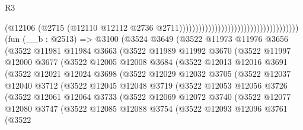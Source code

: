 \begin{lexlean}{R3}
\begin{coremodule}
                                                                        (@12106
                                                                          (@2715
                                                                            (@12110
                                                                              @12112
                                                                              @2736
                                                                              @2711)))))))))))))))))))))))))))))))))))))
    (fun (__b : @2513) =>
    @3100
      (@3524
        @3649
        (@3522
          @11973
          @11976
          @3656
          (@3522
            @11981
            @11984
            @3663
            (@3522
              @11989
              @11992
              @3670
              (@3522
                @11997
                @12000
                @3677
                (@3522
                  @12005
                  @12008
                  @3684
                  (@3522
                    @12013
                    @12016
                    @3691
                    (@3522
                      @12021
                      @12024
                      @3698
                      (@3522
                        @12029
                        @12032
                        @3705
                        (@3522
                          @12037
                          @12040
                          @3712
                          (@3522
                            @12045
                            @12048
                            @3719
                            (@3522
                              @12053
                              @12056
                              @3726
                              (@3522
                                @12061
                                @12064
                                @3733
                                (@3522
                                  @12069
                                  @12072
                                  @3740
                                  (@3522
                                    @12077
                                    @12080
                                    @3747
                                    (@3522
                                      @12085
                                      @12088
                                      @3754
                                      (@3522
                                        @12093
                                        @12096
                                        @3761
                                        (@3522

\end{coremodule}
\end{lexlean}
